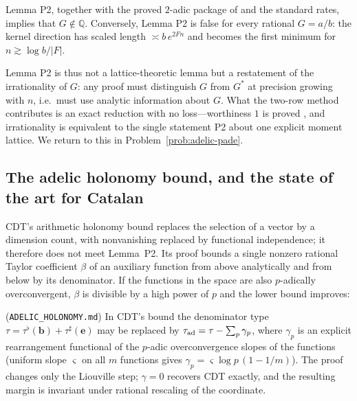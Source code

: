\begin{proposition}
Lemma P2, together with the proved $2$-adic package of \cite{CatalanLean} and the standard rates, implies that $G\notin\mathbb Q$. Conversely, Lemma P2 is false for every rational $G=a/b$: the kernel direction has scaled length $\asymp b\,e^{2Fn}$ and becomes the first minimum for $n\gtrsim\log b/|F|$.
\end{proposition}

Lemma P2 is thus not a lattice-theoretic lemma but a restatement of the irrationality of $G$: any proof must distinguish $G$ from $G^*$ at precision growing with $n$, i.e.\ must use analytic information about $G$. What the two-row method contributes is an exact reduction with no loss---worthiness $1$ is proved \cite{CatalanLean}, and irrationality is equivalent to the single statement P2 about one explicit moment lattice. We return to this in Problem~\ref{prob:adelic-pade}.

\subsection{The adelic holonomy bound, and the state of the art for Catalan}\label{sec:adelic}

CDT's arithmetic holonomy bound replaces the selection of a vector by a dimension count, with nonvanishing replaced by functional independence; it therefore does not meet Lemma~P2. Its proof bounds a single nonzero rational Taylor coefficient $\beta$ of an auxiliary function from above analytically and from below by its denominator. If the functions in the space are also $p$-adically overconvergent, $\beta$ is divisible by a high power of $p$ and the lower bound improves:

\begin{theorem}\label{thm:adelic}
\Proved{} \textup{(\texttt{ADELIC\_HOLONOMY.md})} In CDT's bound the denominator type $\tau=\tau^\flat(\mathbf b)+\tau^\sharp(\mathbf e)$ may be replaced by $\tau_{\rm ad}=\tau-\sum_p\gamma_p$, where $\gamma_p$ is an explicit rearrangement functional of the $p$-adic overconvergence slopes of the functions \textup{(}uniform slope $\varsigma$ on all $m$ functions gives $\gamma_p=\varsigma\log p\,(1-1/m)$\textup{)}. The proof changes only the Liouville step; $\gamma=0$ recovers CDT exactly, and the resulting margin is invariant under rational rescaling of the coordinate.
\end{theorem}

